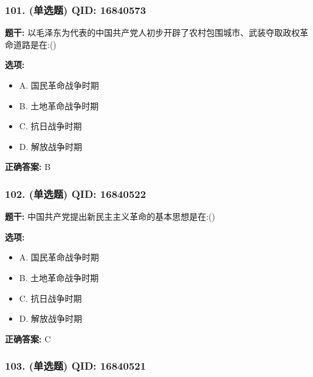 \documentclass[12pt,UTF8]{ctexart}
\begin{document}
\subsubsection*{101. (单选题) \small QID: 16840573}

\textbf{题干:}
以毛泽东为代表的中国共产党人初步开辟了农村包围城市、武装夺取政权革命道路是在:()

\textbf{选项:}
\begin{itemize}[leftmargin=*]

  \item A. 国民革命战争时期

  \item B. 土地革命战争时期

  \item C. 抗日战争时期

  \item D. 解放战争时期

\end{itemize}

\textbf{正确答案:}
B

\vspace{0.3em}\hrulefill\vspace{0.7em}

\subsubsection*{102. (单选题) \small QID: 16840522}

\textbf{题干:}
中国共产党提出新民主主义革命的基本思想是在:()

\textbf{选项:}
\begin{itemize}[leftmargin=*]

  \item A. 国民革命战争时期

  \item B. 土地革命战争时期

  \item C. 抗日战争时期

  \item D. 解放战争时期

\end{itemize}

\textbf{正确答案:}
C

\vspace{0.3em}\hrulefill\vspace{0.7em}

\subsubsection*{103. (单选题) \small QID: 16840521}
\end{document}
